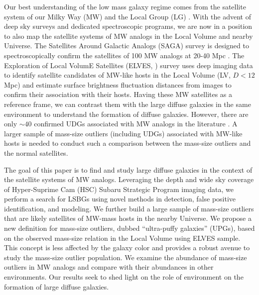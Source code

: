 \documentclass[twocolumn,astrosymb,twocolappendix]{aastex631}
\begin{document}
\begin{CJK*}{UTF8}{gbsn}
Our best understanding of the low mass galaxy regime comes from the satellite system of our Milky Way (MW) and the Local Group (LG) \citep[e.g.,][]{McConnachie2012,Simon2019}. With the advent of deep sky surveys and dedicated spectroscopic programs, we are now in a position to also map the satellite systems of MW analogs in the Local Volume and nearby Universe. The Satellites Around Galactic Analogs (SAGA) survey is designed to spectroscopically confirm the satellites of 100 MW analogs at 20-40 Mpc \citep{SAGA-I,SAGA-II}. The Exploration of Local VolumE Satellites (ELVES,  \citealt{ELVES-I,ELVES-II,CarlstenELVES2022}) survey uses deep imaging data to identify satellite candidates of MW-like hosts in the Local Volume (LV, $D<12$ Mpc) and estimate surface brightness fluctuation distances from images to confirm their association with their hosts. Having these MW satellites as a reference frame, we can contrast them with the large diffuse galaxies in the same environment to understand the formation of diffuse galaxies. However, there are only $\sim 40$ confirmed UDGs associated with MW analogs in the literature \citep{Roman2017b,Cohen2018,SAGA-II,CarlstenELVES2022,Karunakaran2022b}. A larger sample of mass-size outliers (including UDGs) associated with MW-like hosts is needed to conduct such a comparison between the mass-size outliers and the normal satellites.

The goal of this paper is to find and study large diffuse galaxies in the context of the satellite systems of MW analogs. Leveraging the depth and wide sky coverage of Hyper-Suprime Cam (HSC) Subaru Strategic Program imaging data, we perform a search for LSBGs using novel methods in detection, false positive identification, and modeling. We further build a large sample of mass-size outliers that are likely satellites of MW-mass hosts in the nearby Universe. We propose a new definition for mass-size outliers, dubbed ``ultra-puffy galaxies'' (UPGs), based on the observed mass-size relation in the Local Volume using ELVES sample. This concept is less affected by the galaxy color and provides a robust avenue to study the mass-size outlier population. 
We examine the abundance of mass-size outliers in MW analogs and compare with their abundances in other environments. Our results seek to shed light on the role of environment on the formation of large diffuse galaxies. 


\end{CJK*}
\end{document}
